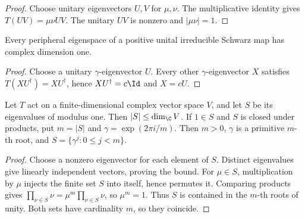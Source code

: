 \begin{proof}\leanok
    Choose unitary eigenvectors $U,V$ for $\mu,\nu$. The multiplicative
    identity gives $T(UV)=\mu\nu UV$. The unitary $UV$ is nonzero and
    $|\mu\nu|=1$.
\end{proof}

\begin{theorem}
    \label{thm:schwarz_peripheral_simple}
    \leanok
    Every peripheral eigenspace of a positive unital irreducible Schwarz map
    has complex dimension one.
\end{theorem}

\begin{proof}\leanok
    Choose a unitary $\gamma$-eigenvector $U$. Every other
    $\gamma$-eigenvector $X$ satisfies $T(XU^\dagger)=XU^\dagger$, hence
    $XU^\dagger=c\Id$ and $X=cU$.
\end{proof}

\begin{theorem}
    \label{thm:peripheral_finite_product_cyclicity}
    \leanok
    Let $T$ act on a finite-dimensional complex vector space $V$, and let
    $S$ be its eigenvalues of modulus one. Then $|S|\leq\dim_{\C}V$.
    If $1\in S$ and $S$ is closed under products, put $m=|S|$ and
    $\gamma=\exp(2\pi i/m)$. Then $m>0$, $\gamma$ is a primitive $m$-th
    root, and $S=\{\gamma^j:0\leq j<m\}$.
\end{theorem}

\begin{proof}\leanok
    Choose a nonzero eigenvector for each element of $S$. Distinct
    eigenvalues give linearly independent vectors, proving the bound.
    For $\mu\in S$, multiplication by $\mu$ injects the finite set $S$ into
    itself, hence permutes it. Comparing products gives
    $\prod_{\nu\in S}\nu=\mu^m\prod_{\nu\in S}\nu$, so $\mu^m=1$.
    Thus $S$ is contained in the $m$-th roots of unity. Both sets have
    cardinality $m$, so they coincide.
\end{proof}

